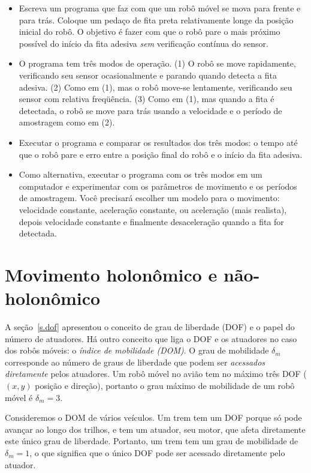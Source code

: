 \begin{framed}
\begin{itemize}
\item Escreva um programa que faz com que um robô móvel se mova para frente e para trás. Coloque um pedaço de fita preta relativamente longe da posição inicial do robô. O objetivo é fazer com que o robô pare o mais próximo possível do início da fita adesiva \emph{sem} verificação contínua do sensor. 
\item O programa tem três modos de operação. (1) O robô se move rapidamente, verificando seu sensor ocasionalmente e parando quando detecta a fita adesiva. (2) Como em (1), mas o robô move-se lentamente, verificando seu sensor com relativa freqüência. (3) Como em (1), mas quando a fita é detectada, o robô se move para trás usando a velocidade e o período de amostragem como em (2).
\item Executar o programa e comparar os resultados dos três modos: o tempo até que o robô pare e erro entre a posição final do robô e o início da fita adesiva.
\item Como alternativa, executar o programa com os três modos em um computador e experimentar com os parâmetros de movimento e os períodos de amostragem. Você precisará escolher um modelo para o movimento: velocidade constante, aceleração constante, ou aceleração (mais realista), depois velocidade constante e finalmente desaceleração quando a fita for detectada.
\end{itemize}
\end{framed}



\section{Movimento holonômico e não-holonômico}\label{s.holonomic}

A seção~\ref{s.dof} apresentou o conceito de grau de liberdade (DOF) e o papel do número de atuadores. Há outro conceito que liga o DOF e os atuadores no caso dos robôs móveis: o \emph{índice de mobilidade (DOM)}. O grau de mobilidade $\delta_m$ corresponde ao número de graus de liberdade que podem ser \emph{acessados diretamente} pelos atuadores. Um robô móvel no avião tem no máximo três DOF ($(x,y)$ posição e direção), portanto o grau máximo de mobilidade de um robô móvel é $\delta_m = 3$.

Consideremos o DOM de vários veículos. Um trem tem um DOF porque só pode avançar ao longo dos trilhos, e tem um atuador, seu motor, que afeta diretamente este único grau de liberdade. Portanto, um trem tem um grau de mobilidade de $\delta_m = 1$, o que significa que o único DOF pode ser acessado diretamente pelo atuador.

